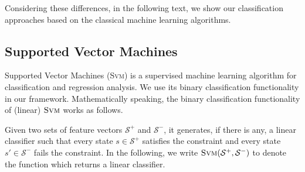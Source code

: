 Considering these differences,
in the following text, 
we show our classification approaches based on the classical machine learning algorithms. 


\subsection{Supported Vector Machines}
\label{subsec:svm}
Supported Vector Machines (\textsc{Svm}) is a supervised machine learning algorithm for classification and regression analysis. 
We use its binary classification functionality in our framework. 
Mathematically speaking, the binary classification functionality of (linear) $\textsc{Svm}$ works as follows. 

Given two sets of feature vectors $\mathcal{S}^+$ and $\mathcal{S}^-$, it generates, 
if there is any, a linear classifier 
such that every state $s \in \mathcal{S}^+$ satisfies the constraint and every state $s' \in \mathcal{S}^-$ fails the constraint. 
In the following, we write $\textsc{Svm}(\mathcal{S}^+, \mathcal{S}^-)$ to denote the function which returns a linear classifier.

